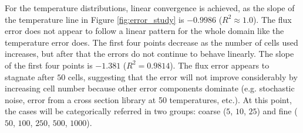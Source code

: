 \documentclass[letterpaper]{mc2023}
\begin{document}
For the temperature distributions, linear convergence is achieved, as the slope of the temperature line in Figure \ref{fig:error_study} is
$-0.9986$ ($R^2\approx1.0$). The flux error does not appear to follow a linear pattern for the whole domain like the temperature error does.
The first four points decrease as the number of cells used increases, but after that the errors do not continue to behave linearly. The slope
of the first four points is $-1.381$ ($R^2=0.9814$). The flux error appears to stagnate after $50$ cells, suggesting that the error will not
improve considerably by increasing cell number because other error components dominate (e.g. stochastic noise, error from a cross section
library at 50 temperatures, etc.). At this point, the cases will be categorically referred in two groups: coarse ($5$, $10$, $25$) and fine
($50$, $100$, $250$, $500$, $1000$).
\end{document}
